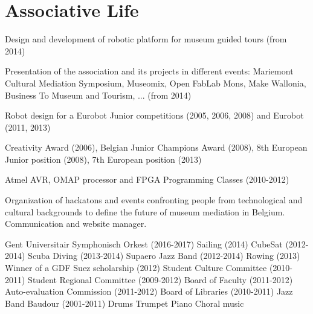 \documentclass[a4paper]{deedy-resume} %
\begin{document}

\section{Associative Life}
\vspace{5pt}


\vspace{5pt} %
\begin{tightitemize}
	\item Design and development of robotic platform for museum guided tours (from 2014)
	\item Presentation of the association and its projects in different events: Mariemont Cultural Mediation Symposium, Museomix, Open FabLab Mons, Make Wallonia, Business To Museum and Tourism, ... (from 2014)
	\item Robot design for a Eurobot Junior competitions (2005, 2006, 2008) and Eurobot (2011, 2013)
	\item Creativity Award (2006), Belgian Junior Champions Award (2008), 8th European Junior position (2008), 7th European position (2013)
	\item Atmel AVR, OMAP processor and FPGA Programming Classes (2010-2012)
\end{tightitemize}

\vspace{12pt}


Organization of hackatons and events confronting people from technological and cultural backgrounds to define the future of museum mediation in Belgium. Communication and website manager.

\vspace{12pt}


\location{}
\vspace{3pt}
Gent Universitair Symphonisch Orkest (2016-2017) \textbullet{} Sailing (2014) \textbullet{} CubeSat (2012-2014) \textbullet{} Scuba Diving (2013-2014) \textbullet{} Supaero Jazz Band (2012-2014) \textbullet{} Rowing (2013) \textbullet{} Winner of a GDF Suez scholarship (2012) \textbullet{}  Student Culture Committee (2010-2011) \textbullet{} Student Regional Committee (2009-2012) \textbullet{} Board of Faculty (2011-2012)  \textbullet{} Auto-evaluation Commission (2011-2012) \textbullet{} Board of Libraries (2010-2011) \textbullet{} Jazz Band Baudour (2001-2011) \textbullet{} Drums \textbullet{} Trumpet \textbullet{} Piano \textbullet{} Choral music


\sectionspace %
\vspace{10pt}
\end{document}
